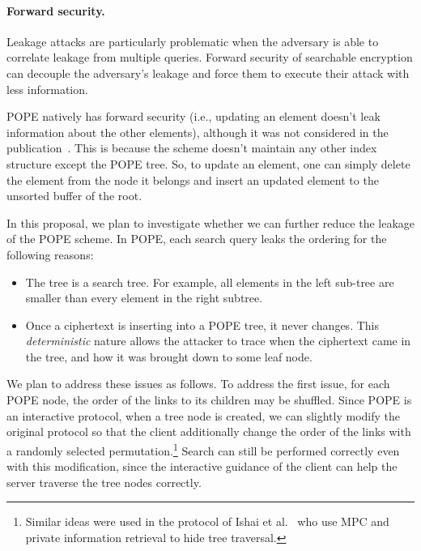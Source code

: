 \paragraph{Forward security.} Leakage attacks are particularly problematic when
the adversary is able to correlate leakage from multiple queries.  Forward
security of searchable encryption can decouple the adversary's leakage and force
them to execute their attack with less information.  

POPE natively has forward security (i.e., updating an element doesn't leak
information about the other elements), although it was not considered in the
publication~\cite{CCS:RACY16}.  This is because the scheme doesn't maintain any
other index structure except the POPE tree. So, to update an element, one can
simply delete the element from the node it belongs and insert an updated
element to the unsorted buffer of the root. 

In this proposal, we plan to investigate whether we can further reduce the
leakage of the POPE scheme. 
%
In POPE, each search query leaks the ordering  for the following reasons: 
\begin{itemize}\setlength\itemsep{0em}
\item The tree is a search tree. For example, all elements in the
  left sub-tree are smaller than every element in the right subtree.
\item Once a ciphertext is inserting into a POPE tree, it never changes. This {\em
  deterministic} nature allows the attacker to trace when the ciphertext came
  in the tree, and how it was brought down to some leaf node.  
\end{itemize}

We plan to address these issues as follows. To address the first issue, for
each POPE node, the order of the links to its children may be shuffled. Since
POPE is an interactive protocol, when a tree node is created, we can slightly
modify the original protocol so that the client additionally change the order
of the links with a randomly selected permutation.\footnote{Similar ideas were used in the protocol of Ishai et al.~\cite{RSA:IKLO16} who use MPC and private information retrieval to hide tree traversal.}
%
Search can still be performed correctly even with this
modification, since the interactive guidance of the client can help the server
traverse the tree nodes correctly. 
    
